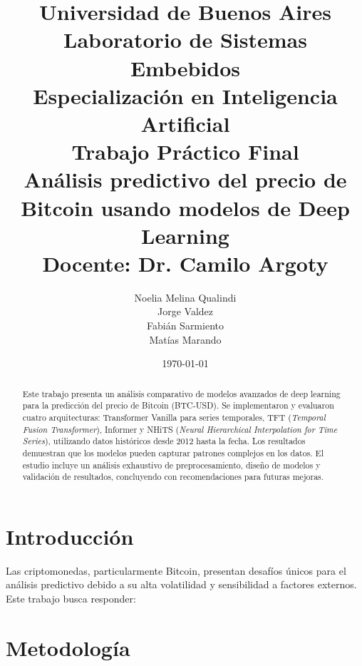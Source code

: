 \documentclass[12pt]{article}
\title{
    \vspace{-2cm}
    \normalsize \textbf{Universidad de Buenos Aires} \\
    \textbf{Laboratorio de Sistemas Embebidos} \\
    \textbf{Especialización en Inteligencia Artificial} \\
    \vspace{0.5cm}
    {Trabajo Práctico Final} \\
    \vspace{1cm}
    \Large \textbf{Análisis predictivo del precio de Bitcoin usando modelos de Deep Learning} \\
    \vspace{1cm}
    \large Docente: Dr. Camilo Argoty
    \vspace{1cm}
}
\author{
    Noelia Melina Qualindi \\
    Jorge Valdez \\
    Fabián Sarmiento \\
    Matías Marando
    \vspace{1cm}
}
\date{\today}
\begin{document}
\maketitle


\begin{abstract}
Este trabajo presenta un análisis comparativo de modelos avanzados de deep learning para la predicción del precio de Bitcoin (BTC-USD). Se implementaron y evaluaron cuatro arquitecturas:  Transformer Vanilla para series temporales, TFT (\textit{Temporal Fusion Transformer}), Informer y  NHiTS (\textit{Neural Hierarchical Interpolation for Time Series}), utilizando datos históricos desde 2012 hasta la fecha.
Los resultados demuestran que los modelos pueden capturar patrones complejos en los datos. %
El estudio incluye un análisis exhaustivo de preprocesamiento, diseño de modelos y validación de resultados, concluyendo con recomendaciones para futuras mejoras.
\end{abstract}


\newpage
\section{Introducción}
\label{sec:intro}

Las criptomonedas, particularmente Bitcoin, presentan desafíos únicos para el análisis predictivo debido a su alta volatilidad y sensibilidad a factores externos. Este trabajo busca responder:

\begin{center}
\end{center}


\newpage
\section{Metodología}
\label{sec:metodologia}
\end{document}
